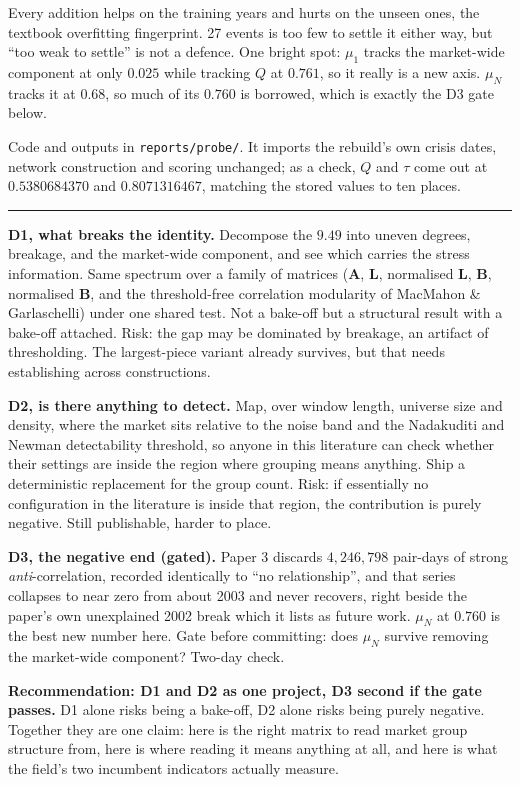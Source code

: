 \documentclass[11pt,a4paper]{article}
\newcommand{\Q}{Q}
\newcommand{\Lap}{\mathbf{L}}
\newcommand{\Amat}{\mathbf{A}}
\newcommand{\Bmat}{\mathbf{B}}
\newcommand{\logday}[1]{\par\vspace{3mm}\noindent{\large\textbf{#1}}\par\vspace{1mm}\hrule\vspace{2mm}\noindent}
\begin{document}
Every addition helps on the training years and hurts on the unseen ones, the
textbook overfitting fingerprint. 27 events is too few to settle it either way,
but ``too weak to settle'' is not a defence. One bright spot: $\mu_1$ tracks the
market-wide component at only $0.025$ while tracking $\Q$ at $0.761$, so it
really is a new axis. $\mu_N$ tracks it at $0.68$, so much of its $0.760$ is
borrowed, which is exactly the D3 gate below.

Code and outputs in \texttt{reports/probe/}. It imports the rebuild's own crisis
dates, network construction and scoring unchanged; as a check, $\Q$ and $\tau$
come out at $0.5380684370$ and $0.8071316467$, matching the stored values to ten
places.

\logday{12 August: proposed directions and open questions}

\textbf{D1, what breaks the identity.} Decompose the $9.49$ into uneven degrees,
breakage, and the market-wide component, and see which carries the stress
information. Same spectrum over a family of matrices ($\Amat$, $\Lap$,
normalised $\Lap$, $\Bmat$, normalised $\Bmat$, and the threshold-free
correlation modularity of MacMahon \& Garlaschelli) under one shared test. Not a
bake-off but a structural result with a bake-off attached. Risk: the gap may be
dominated by breakage, an artifact of thresholding. The largest-piece variant
already survives, but that needs establishing across constructions.

\textbf{D2, is there anything to detect.} Map, over window length, universe size
and density, where the market sits relative to the noise band and the
Nadakuditi and Newman detectability threshold, so anyone in this literature can
check whether their settings are inside the region where grouping means
anything. Ship a deterministic replacement for the group count. Risk: if
essentially no configuration in the literature is inside that region, the
contribution is purely negative. Still publishable, harder to place.

\textbf{D3, the negative end (gated).} Paper 3 discards $4{,}246{,}798$
pair-days of strong \emph{anti}-correlation, recorded identically to ``no
relationship'', and that series collapses to near zero from about 2003 and never
recovers, right beside the paper's own unexplained 2002 break which it lists as
future work. $\mu_N$ at $0.760$ is the best new number here. Gate before
committing: does $\mu_N$ survive removing the market-wide component? Two-day
check.

\textbf{Recommendation: D1 and D2 as one project, D3 second if the gate passes.}
D1 alone risks being a bake-off, D2 alone risks being purely negative. Together
they are one claim: here is the right matrix to read market group structure
from, here is where reading it means anything at all, and here is what the
field's two incumbent indicators actually measure.
\end{document}
